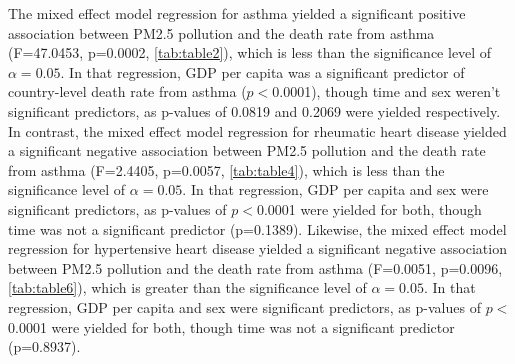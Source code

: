 \documentclass[12pt, letterpaper, twoside]{article}\usepackage[]{graphicx}\usepackage[]{xcolor}
\begin{document}
The mixed effect model regression for asthma yielded a significant
positive association between PM2.5 pollution and the death rate from asthma
(F=47.0453, p=0.0002, \autoref{tab:table2}), which is less
than the significance level of \begin{math}\alpha = 0.05\end{math}. In that
regression, GDP per capita was a significant predictor of country-level death rate
from asthma (\begin{math}p<\end{math}0.0001), though time and sex weren't
significant predictors, as p-values of 0.0819 and 0.2069 were yielded
respectively. In contrast, the mixed effect model regression for rheumatic heart
disease yielded a significant negative association between PM2.5 pollution and
the death rate from asthma (F=2.4405, p=0.0057, \autoref{tab:table4}), which is
less than the significance level of \begin{math}\alpha = 0.05\end{math}. In that
regression, GDP per capita and sex were significant predictors, as p-values of
\begin{math}p<\end{math}0.0001 were yielded for both, though time was not a
significant predictor (p=0.1389). Likewise, the mixed effect model regression for
hypertensive heart disease yielded a significant negative association between
PM2.5 pollution and the death rate from asthma (F=0.0051, p=0.0096,
\autoref{tab:table6}), which is greater than the significance level of
\begin{math}\alpha = 0.05\end{math}. In that regression, GDP per capita and sex
were significant predictors, as p-values of \begin{math}p<\end{math}0.0001 were
yielded for both, though time was not a significant predictor (p=0.8937).
\end{document}
